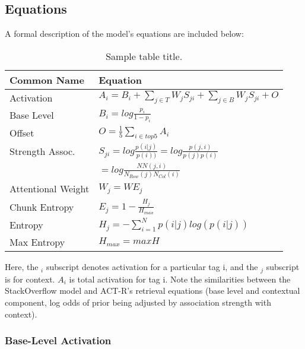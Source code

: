 \documentclass[10pt,letterpaper]{article}
\begin{document}
\subsection{Equations}

A formal description of the model's equations are included below:

\begin{table}[!ht]
  \begin{center} 
    \caption{Sample table title.} 
    \label{sample-table} 
    \vskip 0.12in
    \begin{tabular}{ll} 
      \hline
      Common Name &  Equation \\
      \hline
      Activation & 		$A_{i} = B_{i} + \sum_{j\in T}^{ } W_{j} S_{ji} + \sum_{j\in B}^{ } W_{j} S_{ji} + O$ \\
      Base Level & 		$B_{i} = log \frac{p_{i}}{1-p_{i}}$ \\
      Offset & 			$O = \frac{1}{5}\sum_{i\in top 5}^{ } A_{i}$ \\
      Strength Assoc. &		$S_{ji} = log \frac{p(i|j)}{p(i))} = log \frac{p(j,i)}{p(j)p(i)}$ \\
      & 			$= log \frac{NN(j,i)}{N_{Row}(j)N_{Col}(i)}$ \\
      Attentional Weight	& $W_{j} = WE_{j}$ \\
      Chunk Entropy & 		$E_{j} = 1-\frac{H_{j}}{H_{max}}$ \\
      Entropy & 		$H_{j} = -\sum_{i=1}^{N}p(i|j)log\left (  p(i|j) \right )$ \\
      Max Entropy & 		$H_{max} = maxH$ \\
      \hline
    \end{tabular} 
  \end{center} 
\end{table}

Here, the $_{i}$ subscript denotes activation for a particular tag i, and the $_{j}$ subscript is for context.
$A_{i}$ is total activation for tag i.
Note the similarities between the StackOverflow model and ACT-R's retrieval equations (base level and contextual component, log odds of prior being adjusted by association strength with context).

\subsubsection{Base-Level Activation}
\end{document}

